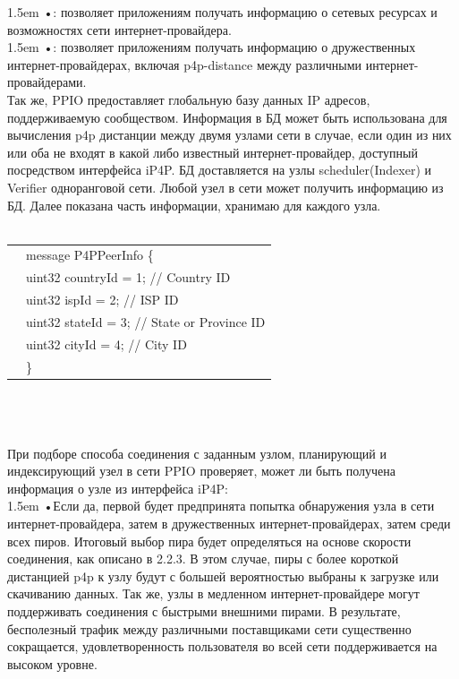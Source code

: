 \documentclass[10pt,a4paper]{article}
\begin{document}
\hangindent 1.5em
\noindent   
•: позволяет приложениям получать информацию о сетевых ресурсах и возможностях сети интернет-провайдера.
\vspace{-0.8em}
\\

\hangindent 1.5em
\noindent   
•: позволяет приложениям получать информацию о дружественных интернет-провайдерах, включая p4p-distance между различными интернет-провайдерами.
\vspace{-0.6em}
\\

\noindent 
Так же, PPIO предоставляет глобальную базу данных IP адресов, поддерживаемую сообществом. Информация в БД может быть использована для вычисления p4p дистанции между двумя узлами сети в случае, если один из них или оба не входят в какой либо известный интернет-провайдер, доступный посредством интерфейса iP4P. БД доставляется на узлы scheduler(Indexer) и Verifier одноранговой сети. Любой узел в сети может получить информацию из БД. Далее показана часть информации, хранимаю для каждого узла.\\\\
\begin{tabular}{r|l}
&message P4PPeerInfo   \{ \\
	&\qquad uint32 countryId = 1;   //  Country ID \\
	&\qquad uint32 ispId = 2;       //  ISP ID  \\ 
	&\qquad uint32 stateId = 3;     // State or  Province ID \\
	&\qquad uint32 cityId = 4;      // City ID  \\ 
	&\}   \\ 
	
\end{tabular} \\
  \vspace{-0.5em}
\\\\
\noindent 
При подборе способа соединения с заданным узлом, планирующий и индексирующий узел в сети PPIO проверяет, может ли быть получена информация о узле из интерфейса iP4P:
\vspace{-0.8em}
\\  

\hangindent 1.5em
\noindent   
•\quad Если да, первой будет предпринята попытка обнаружения узла в сети интернет-провайдера, затем в дружественных интернет-провайдерах, затем среди всех пиров. Итоговый выбор пира будет определяться на основе скорости соединения, как описано в 2.2.3. В этом случае, пиры с более короткой дистанцией p4p к узлу будут с большей вероятностью выбраны к загрузке или скачиванию данных. Так же, узлы в медленном интернет-провайдере могут поддерживать соединения с быстрыми внешними пирами. В результате, бесполезный трафик между различными поставщиками сети существенно сокращается, удовлетворенность пользователя во всей сети поддерживается на высоком уровне.
\vspace{-0.8em}
\\
\end{document}
